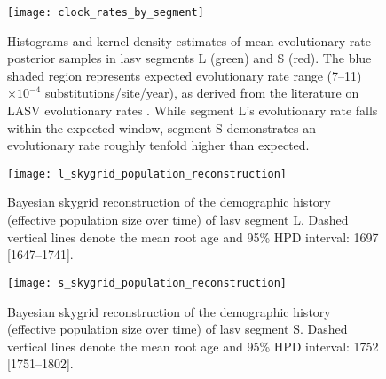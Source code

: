 \begin{figure}[ht]
  \centering
  \medskip
  \texttt{[image: clock\_rates\_by\_segment]}
  \caption[LASV evolutionary rates by segment]{Histograms and kernel density estimates of mean evolutionary rate posterior samples in \gls{lasv} segments L (green) and S (red). The blue shaded region represents expected evolutionary rate range (7--11)$\times10^{-4}$ substitutions/site/year), as derived from the literature on LASV evolutionary rates \cite{andersen2015clinical, fichet2016spatial}. While segment L's evolutionary rate falls within the expected window, segment S demonstrates an evolutionary rate roughly tenfold higher than expected.}
  \label{fig:lassa_clock_rates}
\end{figure}

\begin{figure}[ht]
  \centering
  \medskip
  \texttt{[image: l\_skygrid\_population\_reconstruction]}
  \caption[Demographic history of Lassa's L segment]{Bayesian skygrid reconstruction of the demographic history (effective population size over time) of \gls{lasv} segment L. Dashed vertical lines denote the mean root age and 95\% HPD interval: 1697 [1647--1741].}
  \label{fig:l_skygrid}
\end{figure}

\begin{figure}[ht]
  \centering
  \medskip
  \texttt{[image: s\_skygrid\_population\_reconstruction]}
  \caption[Demographic history of Lassa's S segment]{Bayesian skygrid reconstruction of the demographic history (effective population size over time) of \gls{lasv} segment S. Dashed vertical lines denote the mean root age and 95\% HPD interval: 1752 [1751--1802].}
  \label{fig:s_skygrid}
\end{figure}


\cleardoublepage


